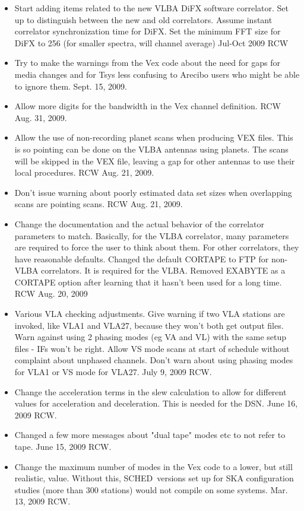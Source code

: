 \documentclass{report}
\newcommand{\schedb}{{\sc SCHED~}}
\begin{document}
\begin{itemize}
\item Start adding items related to the new VLBA DiFX software
correlator.  Set up to distinguish between the new and old
correlators.  Assume instant correlator synchronization time for DiFX.
Set the minimum FFT size for DiFX to 256 (for smaller spectra, will
channel average) Jul-Oct 2009 RCW

\item Try to make the warnings from the Vex code about the need for
gaps for media changes and for Tsys less confusing to Arecibo users who
might be able to ignore them.  Sept. 15, 2009.

\item Allow more digits for the bandwidth in the Vex channel definition.
RCW Aug. 31, 2009.

\item Allow the use of non-recording planet scans when producing VEX
files.  This is so pointing can be done on the VLBA antennas using
planets.  The scans will be skipped in the VEX file, leaving a gap
for other antennas to use their local procedures.  RCW Aug. 21, 2009.

\item Don't issue warning about poorly estimated data set sizes when
overlapping scans are pointing scans.  RCW Aug. 21, 2009.

\item Change the documentation and the actual behavior of the
correlator parameters to match.  Basically, for the VLBA correlator,
many parameters are required to force the user to think about them.
For other correlators, they have reasonable defaults.  Changed the
default CORTAPE to FTP for non-VLBA correlators.  It is required for
the VLBA.  Removed EXABYTE as a CORTAPE option after learning that it
hasn't been used for a long time.  RCW Aug. 20, 2009

\item Various VLA checking adjustments.  Give warning if two VLA
stations are invoked, like VLA1 and VLA27, because they won't both
get output files.  Warn against using 2 phasing modes (eg VA and VL)
with the same setup files - IFs won't be right.  Allow VS mode scans
at start of schedule without complaint about unphased channels.  Don't
warn about using phasing modes for VLA1 or VS mode for VLA27.
July 9, 2009  RCW.

\item Change the acceleration terms in the slew calculation to allow
for different values for acceleration and deceleration.  This is needed
for the DSN.  June 16, 2009  RCW.

\item Changed a few more messages about "dual tape" modes etc to not
refer to tape.  June 15, 2009  RCW.

\item Change the maximum number of modes in the Vex code to a
lower, but still realistic, value.  Without this, \schedb versions
set up for SKA configuration studies (more than 300 stations) would
not compile on some systems.  Mar. 13, 2009  RCW.

\end{itemize}
\end{document}
